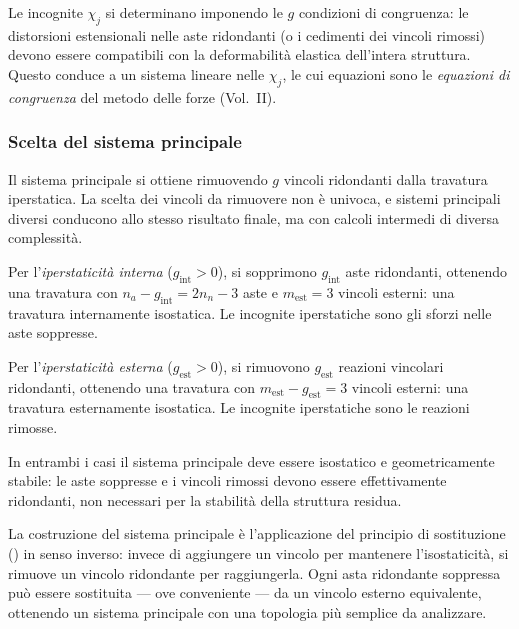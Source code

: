Le incognite $\chi_j$ si determinano imponendo
le $g$ condizioni di congruenza: le distorsioni
estensionali nelle aste ridondanti (o i cedimenti
dei vincoli rimossi) devono essere compatibili con
la deformabilità elastica dell'intera struttura.
Questo conduce a un sistema lineare nelle $\chi_j$,
le cui equazioni sono le \emph{equazioni di
	congruenza} del metodo delle forze (Vol.~II).

\subsubsection{Scelta del sistema principale}
\label{subsec:sistema_principale}

Il sistema principale si ottiene rimuovendo $g$
vincoli ridondanti dalla travatura iperstatica.
La scelta dei vincoli da rimuovere non è univoca,
e sistemi principali diversi conducono allo stesso
risultato finale, ma con calcoli intermedi di
diversa complessità.

Per l'\emph{iperstaticità interna} ($g_\text{int} > 0$),
si sopprimono $g_\text{int}$ aste ridondanti,
ottenendo una travatura con $n_a - g_\text{int}
= 2n_n - 3$ aste e $m_\text{est} = 3$ vincoli
esterni: una travatura internamente isostatica.
Le incognite iperstatiche sono gli sforzi nelle
aste soppresse.

Per l'\emph{iperstaticità esterna} ($g_\text{est} > 0$),
si rimuovono $g_\text{est}$ reazioni vincolari
ridondanti, ottenendo una travatura con $m_\text{est}
- g_\text{est} = 3$ vincoli esterni: una travatura
esternamente isostatica. Le incognite iperstatiche
sono le reazioni rimosse.

In entrambi i casi il sistema principale deve essere
isostatico e geometricamente stabile: le aste
soppresse e i vincoli rimossi devono essere
effettivamente ridondanti, non necessari per
la stabilità della struttura residua.

\begin{oss}
	La costruzione del sistema principale è
	l'applicazione del principio di sostituzione
	() in senso
	inverso: invece di aggiungere un vincolo per
	mantenere l'isostaticità, si rimuove un vincolo
	ridondante per raggiungerla. Ogni asta ridondante
	soppressa può essere sostituita --- ove conveniente
	--- da un vincolo esterno equivalente, ottenendo
	un sistema principale con una topologia più
	semplice da analizzare.
\end{oss}

